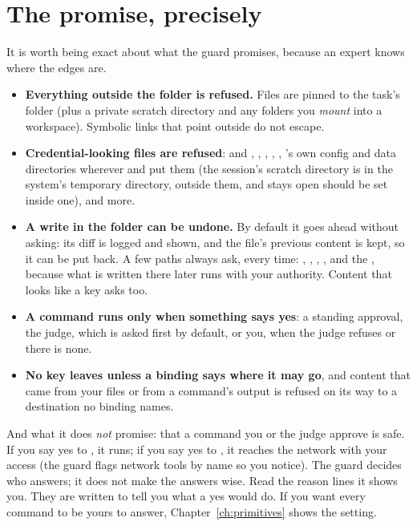 \section{The promise, precisely}

It is worth being exact about what the guard promises, because an expert
knows where the edges are.

\begin{itemize}
  \item \textbf{Everything outside the folder is refused.} Files are pinned
    to the task's folder (plus a private scratch directory and any folders
    you \emph{mount} into a workspace). Symbolic links that point outside do
    not escape.
  \item \textbf{Credential-looking files are refused}:  and ,
    , , ,
    , \nodwyn's own config and data directories
    wherever  and  put them
    (the session's scratch directory is in the system's temporary directory,
    outside them, and stays open should  be set inside one),
    and more.
  \item \textbf{A write in the folder can be undone.} By default it goes
    ahead without asking: its diff is logged and shown, and the file's
    previous content is kept, so it can be put back. A few paths always
    ask, every time: , , ,
    ,  and the , because what is
    written there later runs with your authority. Content that looks like a
    key asks too.
  \item \textbf{A command runs only when something says yes}: a standing
    approval, the judge, which is asked first by default, or you, when the
    judge refuses or there is none.
  \item \textbf{No key leaves unless a binding says where it may go}, and
    content that came from your files or from a command's output is refused
    on its way to a destination no binding names.
\end{itemize}

And what it does \emph{not} promise: that a command you or the judge
approve is safe. If you say yes to , it runs;
if you say yes to , it reaches the network with your access (the
guard flags network tools by name so you notice). The guard decides who
answers; it does not make the answers wise. Read the reason lines it shows
you. They are written to tell you what a yes would do. If you want every
command to be yours to answer, Chapter~\ref{ch:primitives} shows the
setting.

